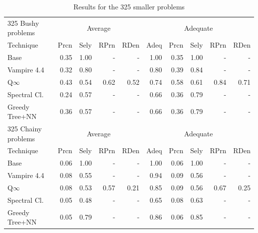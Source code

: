 \documentclass[EPiC]{easychair}
\begin{document}
\begin{table}[hbt]
\begin{center}
\begin{tabular}{|l|rrrr|r|rrrr|}
\hline
325 Bushy problems  & \multicolumn{4}{|c|}{Average} & \multicolumn{5}{|c|}{Adequate} \\
Technique       & Prcn & Sely & RPrn & RDen & Adeq & Prcn & Sely & RPrn & RDen \\
\hline
Base            & 0.35 & 1.00 &  -   &  -   & 1.00 & 0.35 & 1.00 &  -   &  -   \\
Vampire 4.4     & 0.32 & 0.80 &  -   &  -   & 0.80 & 0.39 & 0.84 &  -   &  -   \\
Q$\infty$       & 0.43 & 0.54 & 0.62 & 0.52 & 0.74 & 0.58 & 0.61 & 0.84 & 0.71 \\
Spectral Cl.    & 0.24 & 0.57 &  -   &  -   & 0.66 & 0.36 & 0.79 &  -   &  -   \\
Greedy Tree+NN  & 0.36 & 0.57 &  -   &  -   & 0.66 & 0.36 & 0.79 &  -   &  -   \\
\hline
\hline
325 Chainy problems & \multicolumn{4}{|c|}{Average} & \multicolumn{5}{|c|}{Adequate} \\
Technique       & Prcn & Sely & RPrn & RDen & Adeq & Prcn & Sely & RPrn & RDen \\
\hline
Base            & 0.06 & 1.00 &  -   &  -   & 1.00 & 0.06 & 1.00 &  -   &  -   \\
Vampire 4.4     & 0.08 & 0.55 &  -   &  -   & 0.94 & 0.09 & 0.56 &  -   &  -   \\
Q$\infty$       & 0.08 & 0.53 & 0.57 & 0.21 & 0.85 & 0.09 & 0.56 & 0.67 & 0.25 \\
Spectral Cl.    & 0.05 & 0.48 &  -   &  -   & 0.65 & 0.08 & 0.63 &  -   &  -   \\
Greedy Tree+NN  & 0.05 & 0.79 &  -   &  -   & 0.86 & 0.06 & 0.85 &  -   &  -   \\
\hline
\end{tabular}
\caption{Results for the 325 smaller problems}
\label{Results325}
\end{center}
\end{table}
\end{document}

